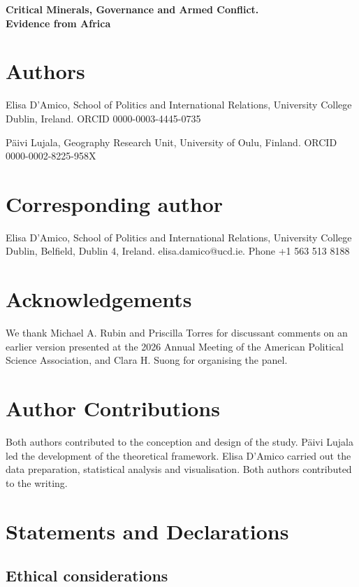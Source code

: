 \documentclass[11pt]{article}
\begin{document}
\begin{center}
{\large\bfseries Critical Minerals, Governance and Armed Conflict. \\ Evidence from Africa}
\end{center}

\section*{Authors}

\noindent Elisa D'Amico, School of Politics and International Relations,
University College Dublin, Ireland. ORCID 0000-0003-4445-0735

\noindent Päivi Lujala, Geography Research Unit, University of Oulu, Finland.
ORCID 0000-0002-8225-958X

\section*{Corresponding author}

\noindent Elisa D'Amico, School of Politics and International Relations,
University College Dublin, Belfield, Dublin 4, Ireland.  elisa.damico@ucd.ie. Phone +1 563 513 8188

\section*{Acknowledgements}

We thank Michael A. Rubin and Priscilla Torres for discussant comments on an
earlier version presented at the 2026 Annual Meeting of the American Political
Science Association, and Clara H. Suong for organising the panel.

\section*{Author Contributions}

Both authors contributed to the conception and design of the study. Päivi Lujala led the development of the theoretical framework. Elisa D'Amico carried out the data preparation, statistical analysis and visualisation. Both authors contributed to the writing.

\section*{Statements and Declarations}

\subsection*{Ethical considerations}
\end{document}
